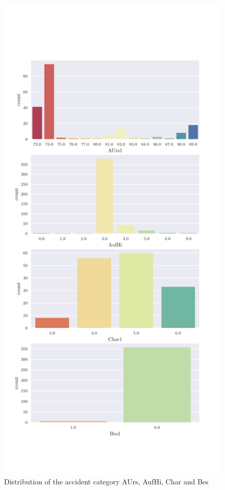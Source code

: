     \begin{figure}[ht!]
        \centering
        \includegraphics[scale=0.7]{CorrAnalysis/data/BAYSIS/02_matched/plots/baysis_matched_count_multiple02}
        \caption{Distribution of the accident category AUrs, AufHi, Char and Bes}
        \label{img:baysis_matched_AUrs}
        \label{img:baysis_matched_AufHi}
        \label{img:baysis_matched_Char}
        \label{img:baysis_matched_Bes}
    \end{figure}

